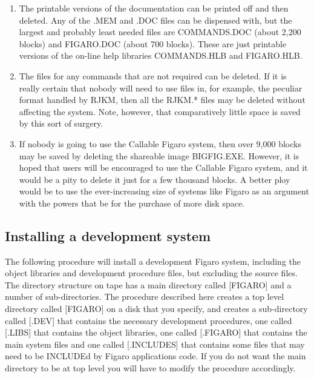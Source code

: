 \begin{enumerate}

\item The printable versions of the documentation can be printed off and then
deleted. Any of the .MEM and .DOC files can be dispensed with, but the largest
and probably least needed files are COMMANDS.DOC (about 2,200 blocks) and
FIGARO.DOC (about 700 blocks). These are just printable versions of the on-line
help libraries COMMANDS.HLB and FIGARO.HLB.

\item The files for any commands that are not required can be deleted.  If it
is really certain that nobody will need to use files in, for example, the
peculiar format handled by RJKM, then all the RJKM.* files may  be deleted
without affecting the system.  Note, however, that  comparatively little space
is saved by this sort of surgery.

\item If nobody is going to use the Callable Figaro  system,  then over  9,000 
blocks  may  be  saved by deleting the shareable image BIGFIG.EXE.  However, it
is hoped that  users  will  be encouraged to use the Callable Figaro system,
and it would be a pity to delete it just for a few thousand blocks.  A better
ploy would be to use the ever-increasing size of systems like Figaro as an 
argument  with  the  powers  that  be  for  the purchase of more disk space.

\end{enumerate}

\subsection{Installing a development system} 

The following procedure will install a development Figaro system, including 
the  object  libraries and development procedure files, but excluding the
source files.  The directory structure  on  tape  has  a main  directory 
called [FIGARO] and a number of sub-directories.  The procedure described here
creates a top level directory called [FIGARO] on  a disk that you specify, and
creates a sub-directory called [.DEV] that contains the necessary development
procedures, one called [.LIBS] that contains the object libraries, one called
[.FIGARO] that contains the main system files and one called [.INCLUDES]  that 
contains  some files  that  may  need to be INCLUDEd by Figaro applications
code.  If you do not want the main directory to be at top level you will have
to modify the procedure accordingly.

